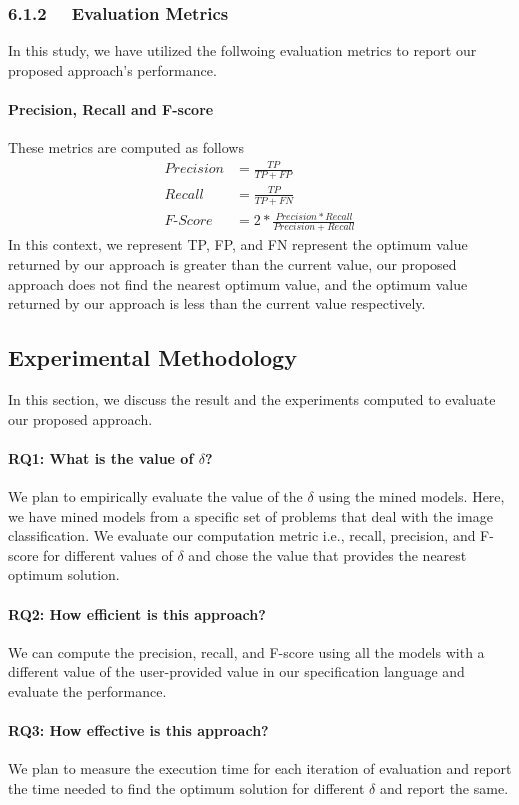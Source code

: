 \subsubsection{6.1.2~~ Evaluation Metrics}
In this study, we have utilized the follwoing evaluation metrics to report our proposed approach's performance.
\paragraph{Precision, Recall and F-score} These metrics are computed as follows
\begin{align}
Precision&=\frac{TP}{TP+FP}\\
Recall &= \frac{TP}{TP+FN}\\
F\text{-}Score&=2*\frac{Precision* Recall}{Precision+Recall}
\end{align}
In this context, we represent TP, FP, and FN represent the optimum value returned by our approach is greater than the current value, our proposed approach does not find the nearest optimum value, and the optimum value returned by our approach is less than the current value respectively.

\subsection{Experimental Methodology}
In this section, we discuss the result and the experiments computed to evaluate our proposed approach.
\paragraph{\textbf{RQ1: What is the value of $\delta$?}}
We plan to empirically evaluate the value of the $\delta$ using the mined models. Here, we have mined models from a specific set of problems that deal with the image classification. We evaluate our computation metric i.e., recall, precision, and F-score for different values of $\delta$ and chose the value that provides the nearest optimum solution.
\paragraph{\textbf{RQ2: How efficient is this approach?}}
We can compute the precision, recall, and F-score using all the models with a different value of the user-provided value in our specification language and evaluate the performance.
\paragraph{\textbf{RQ3: How effective is this approach?}}
We plan to measure the execution time for each iteration of evaluation and report the time needed to find the optimum solution for different $\delta$ and report the same.





